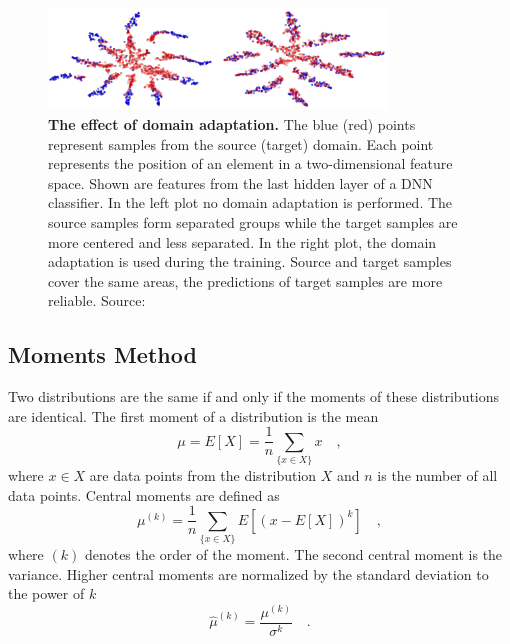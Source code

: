 \begin{figure}
\centering
\includegraphics[width=0.8\textwidth]{chapter_4_stat/DomainAdaptation.png}
\caption[The Effect of Domain Adaptation]{\textbf{The effect of domain adaptation.} The blue (red) points represent samples from the source (target) domain. Each point represents the position of an element in a two-dimensional feature space. Shown are features from the last hidden layer of a DNN classifier. In the left plot no domain adaptation is performed. The source samples form separated groups while the target samples are more centered and less separated. In the right plot, the domain adaptation is used during the training. Source and target samples cover the same areas, the predictions of target samples are more reliable. Source: \cite{DA_Adversarial}}
\label{fig:ch_4_DomainAdaptation}
\end{figure}

\subsection{Moments Method}
Two distributions are the same if and only if the moments of these distributions are identical. The first moment of a distribution is the mean
\begin{equation}
\mu = E[X] = \frac{1}{n}\sum_{\{x \in X\}} x \quad ,
\end{equation}
where $x \in X$ are data points from the distribution $X$ and $n$ is the number of all data points. Central moments are defined as 
\begin{equation}
\mu^{(k)} = \frac{1}{n} \sum_{\{x \in X\}} E\left[\left(x-E[X]\right)^k\right] \quad ,
\end{equation}
where $(k)$ denotes the order of the moment. The second central moment is the variance. Higher central moments are normalized by the standard deviation to the power of $k$
\begin{equation}
\hat{\mu}^{(k)} = \frac{\mu^{(k)}}{\sigma^k} \quad .
\end{equation}

